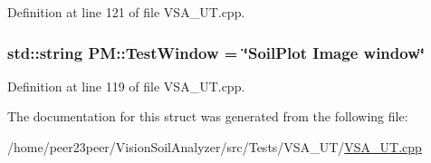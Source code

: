 Definition at line 121 of file V\+S\+A\+\_\+\+U\+T.\+cpp.

\hypertarget{struct_p_m_a2141a6fa1189cc201abe78a3a8613bd9}{}
\subsubsection[{Test\+Window}]{\setlength{\rightskip}{0pt plus 5cm}std\+::string P\+M\+::\+Test\+Window = \char`\"{}Soil\+Plot Image window\char`\"{}}\label{struct_p_m_a2141a6fa1189cc201abe78a3a8613bd9}


Definition at line 119 of file V\+S\+A\+\_\+\+U\+T.\+cpp.



The documentation for this struct was generated from the following file\+:\begin{DoxyCompactItemize}
\item 
/home/peer23peer/\+Vision\+Soil\+Analyzer/src/\+Tests/\+V\+S\+A\+\_\+\+U\+T/\hyperlink{_v_s_a___u_t_8cpp}{V\+S\+A\+\_\+\+U\+T.\+cpp}\end{DoxyCompactItemize}
